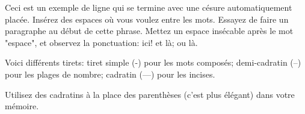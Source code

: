 	Ceci est un exemple de ligne qui se termine avec une césure automatiquement placée.
	Insérez des espaces où vous voulez entre les mots. 
	Essayez de faire un paragraphe au début de cette phrase. Mettez un espace insécable après le mot "espace", et observez la ponctuation: ici! et là; ou là.
	
	Voici différents tirets: tiret simple (-) pour les mots composés; demi-cadratin (--) pour les plages de nombre; cadratin (---) pour les incises.
	
	
	
	Utilisez des cadratins à la place des parenthèses (c'est plus élégant) dans votre mémoire.
	
	
